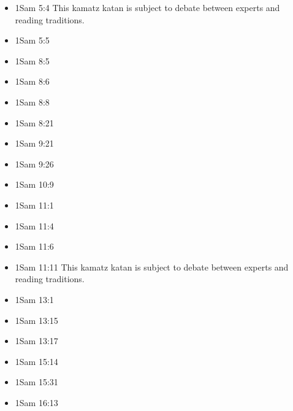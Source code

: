 \documentclass[14pt]{article}
\begin{document}
\begin{multicols}{2}
\begin{itemize}
							\item 1Sam 5:4 This kamatz katan is subject to debate between experts and reading traditions.
							
							\item 1Sam 5:5
							
							\item 1Sam 8:5
							
							\item 1Sam 8:6
							
							\item 1Sam 8:8
							
							\item 1Sam 8:21
							
							\item 1Sam 9:21
							
							\item 1Sam 9:26
							
							\item 1Sam 10:9
							
							\item 1Sam 11:1
							
							\item 1Sam 11:4
							
							\item 1Sam 11:6
							
							\item 1Sam 11:11 This kamatz katan is subject to debate between experts and reading traditions.
							
							\item 1Sam 13:1
							
							\item 1Sam 13:15
							
							\item 1Sam 13:17
							
							\item 1Sam 15:14
							
							\item 1Sam 15:31
							
							\item 1Sam 16:13
							

\end{itemize}
\end{multicols}
\end{document}
